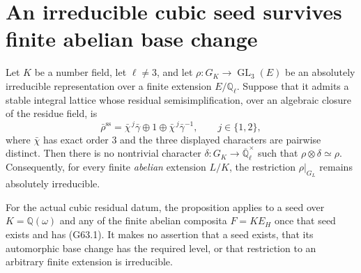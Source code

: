 \section{An irreducible cubic seed survives finite abelian base change}
\label{sec:cubic-seed-abelian-basechange}

\begin{proposition}
\label{AC-G63-selftwist}
Let $K$ be a number field, let $\ell\ne3$, and let
$\rho:G_K\longrightarrow\operatorname{GL}_3(E)$ be an absolutely
irreducible representation over a finite extension $E/\mathbb Q_\ell$.
Suppose that it admits a stable integral lattice whose residual
semisimplification, over an algebraic closure of the residue field, is
\[
 \bar\rho^{\mathrm{ss}}
       =\bar\chi^{\,j}\bar\gamma\oplus1
                         \oplus\bar\chi^{\,j}\bar\gamma^{-1},
 \qquad j\in\{1,2\},                                      \tag{G63.1}
\]
where $\bar\chi$ has exact order $3$ and the three displayed characters
are pairwise distinct.  Then there is no nontrivial character
$\delta:G_K\to\overline{\mathbb Q}_\ell^{\times}$ such that
$\rho\otimes\delta\simeq\rho$.  Consequently, for every finite
\emph{abelian} extension $L/K$, the restriction $\rho|_{G_L}$ remains
absolutely irreducible.

For the actual cubic residual datum, the proposition applies to a seed
over $K=\mathbb Q(\omega)$ and any of the finite abelian composita
$F=K E_H$ once that seed exists and has (G63.1).  It makes no assertion
that a seed exists, that its automorphic base change has the required
level, or that restriction to an arbitrary finite extension is
irreducible.
\end{proposition}

